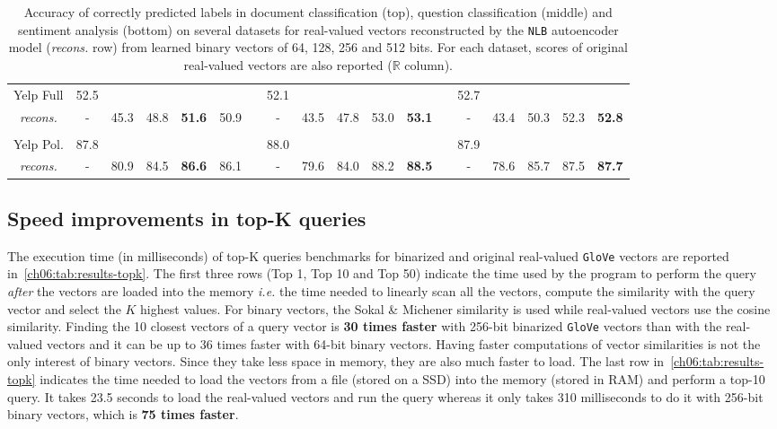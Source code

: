 \begin{table}[h]
{\begin{tabular}{@{}lcccccrcccccrccccc@{}}
            Yelp Full & 52.5 &&&&&& 52.1 &&&&&& 52.7\\
              \multicolumn{1}{c}{\textit{recons.}}
                &-& 45.3 & 48.8 & \textbf{51.6} & 50.9 &
                &-& 43.5 & 47.8 & 53.0 & \textbf{53.1} &
                &-& 43.4 & 50.3 & 52.3 & \textbf{52.8}\\\\

            Yelp Pol. & 87.8 &&&&&& 88.0 &&&&&& 87.9\\
              \multicolumn{1}{c}{\textit{recons.}}
                &-& 80.9 & 84.5 & \textbf{86.6} & 86.1 &
                &-& 79.6 & 84.0 & 88.2 & \textbf{88.5} &
                &-& 78.6 & 85.7 & 87.5 & \textbf{87.7}\\
          \bottomrule[0.15em]
        \end{tabular}}
        \caption[Evaluation of vectors reconstructed from binary codes on
        classification tasks.]{Accuracy of correctly predicted labels in
        document classification (top), question classification (middle) and
        sentiment analysis (bottom) on several datasets for real-valued vectors
        reconstructed by the \texttt{NLB} autoencoder model (\textit{recons.}
        row) from learned binary vectors of 64, 128, 256 and 512 bits. For each
        dataset, scores of original real-valued vectors are also reported
        ($\mathbb{R}$ column).}
        \label{ch06:tab:results-reconstructed-classification}
      \end{table}

  \subsection{Speed improvements in top-K queries}
    \label{ch06:subsec:performances-speed}
    The execution time (in milliseconds) of top-K queries benchmarks for
    binarized and original real-valued \texttt{GloVe} vectors are reported
    in~\autoref{ch06:tab:results-topk}. The first three rows (Top 1, Top 10 and
    Top 50) indicate the time used by the program to perform the query
    \textit{after} the vectors are loaded into the memory \textit{i.e.} the time
    needed to linearly scan all the vectors, compute the similarity with the
    query vector and select the $K$ highest values. For binary vectors, the
    Sokal \& Michener similarity is used while real-valued vectors use the
    cosine similarity. Finding the 10 closest vectors of a query vector is
    \textbf{30 times faster} with 256-bit binarized \texttt{GloVe} vectors than
    with the real-valued vectors and it can be up to 36 times faster with 64-bit
    binary vectors. Having faster computations of vector similarities is not the
    only interest of binary vectors. Since they take less space in memory, they
    are also much faster to load. The last row
    in~\autoref{ch06:tab:results-topk} indicates the time needed to load the
    vectors from a file (stored on a SSD) into the memory (stored in RAM) and
    perform a top-10 query. It takes 23.5 seconds to load the real-valued
    vectors and run the query whereas it only takes 310 milliseconds to do it
    with 256-bit binary vectors, which is \textbf{75 times faster}.

